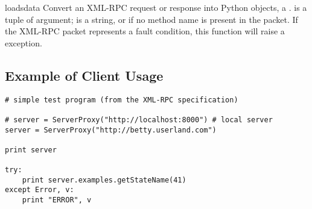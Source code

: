 \begin{funcdesc}{loads}{data}
Convert an XML-RPC request or response into Python objects, a
.   is a tuple of argument; 
is a string, or  if no method name is present in the packet.
If the XML-RPC packet represents a fault condition, this
function will raise a  exception.
\end{funcdesc}



\subsection{Example of Client Usage \label{xmlrpc-client-example}}

\begin{verbatim}
# simple test program (from the XML-RPC specification)

# server = ServerProxy("http://localhost:8000") # local server
server = ServerProxy("http://betty.userland.com")

print server

try:
    print server.examples.getStateName(41)
except Error, v:
    print "ERROR", v
\end{verbatim}

